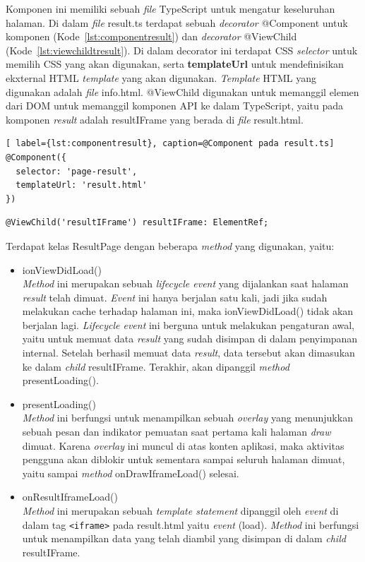 \begin{enumerate}
\begin{enumerate}
		Komponen ini memiliki sebuah \textit{file} TypeScript untuk mengatur keseluruhan halaman. Di dalam \textit{file} result.ts terdapat sebuah \textit{decorator} @Component untuk komponen (Kode~\ref{lst:componentresult}) dan \textit{decorator} @ViewChild (Kode~\ref{lst:viewchildtresult}). Di dalam decorator ini terdapat CSS \textit{selector} untuk memilih CSS yang akan digunakan, serta \textbf{templateUrl} untuk mendefinisikan ekxternal HTML \textit{template} yang akan digunakan. \textit{Template} HTML yang digunakan adalah \textit{file} info.html. @ViewChild digunakan untuk memanggil elemen dari DOM untuk memanggil komponen API ke dalam TypeScript, yaitu pada komponen \textit{result} adalah resultIFrame yang berada di \textit{file} result.html.
	
\begin{lstlisting}[ label={lst:componentresult}, caption=@Component pada result.ts]
@Component({
  selector: 'page-result',
  templateUrl: 'result.html'
})
\end{lstlisting} 

\begin{lstlisting}[label={lst:viewchildtresult}, caption=@ViewChild pada result.ts]
@ViewChild('resultIFrame') resultIFrame: ElementRef;
\end{lstlisting} 

	Terdapat kelas ResultPage dengan beberapa \textit{method} yang digunakan, yaitu:
	
	\begin{itemize}
		\item ionViewDidLoad() \\
		\textit{Method} ini merupakan sebuah \textit{lifecycle event} yang dijalankan saat halaman \textit{result} telah dimuat. \textit{Event} ini hanya berjalan satu kali, jadi jika sudah melakukan cache terhadap halaman ini, maka ionViewDidLoad() tidak akan berjalan lagi. \textit{Lifecycle event} ini berguna untuk melakukan pengaturan awal, yaitu untuk memuat data \textit{result} yang sudah disimpan di dalam penyimpanan internal. Setelah berhasil memuat data \textit{result}, data tersebut akan dimasukan ke dalam \textit{child} resultIFrame. Terakhir, akan dipanggil \textit{method} presentLoading().
		\item presentLoading() \\
		\textit{Method} ini berfungsi untuk menampilkan sebuah \textit{overlay} yang menunjukkan sebuah pesan dan indikator pemuatan saat pertama kali halaman \textit{draw} dimuat. Karena \textit{overlay} ini muncul di atas konten aplikasi, maka aktivitas pengguna akan diblokir untuk sementara sampai seluruh halaman dimuat, yaitu sampai \textit{method} onDrawIframeLoad() selesai. 
		\item onResultIframeLoad() \\
		\textit{Method} ini merupakan sebuah \textit{template statement} dipanggil oleh \textit{event} di dalam tag \texttt{<iframe>} pada result.html yaitu \textit{event} (load). \textit{Method} ini berfungsi untuk menampilkan data yang telah diambil yang disimpan di dalam \textit{child} resultIFrame.
	\end{itemize}
	

\end{enumerate}
\end{enumerate}
